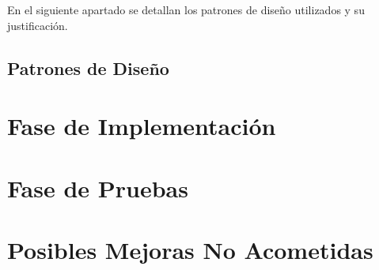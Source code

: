 \documentclass[11pt]{article}
\begin{document}
En el siguiente apartado se detallan los patrones de diseño utilizados y su justificación.

\subsection{Patrones de Diseño}


\pagebreak


\section{Fase de Implementación}

\pagebreak

\section{Fase de Pruebas}

\pagebreak

\section{Posibles Mejoras No Acometidas}

\pagebreak
\end{document}
